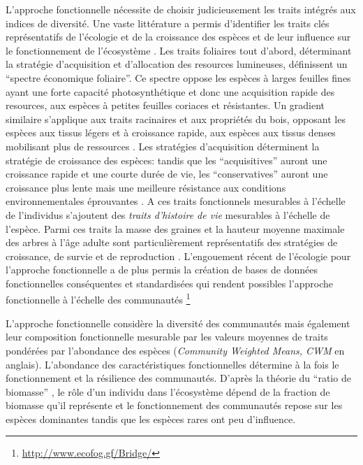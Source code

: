 \documentclass[
  11pt,
  french,
  A4paper,
  extrafontsizes,onecolumn,openright
  ]{memoir}
\begin{document}
L'approche fonctionnelle nécessite de choisir judicieusement les traits
intégrés aux indices de diversité. Une vaste littérature a permis
d'identifier les traits clés représentatifs de l'écologie et de la
croissance des espèces et de leur influence sur le fonctionnement de
l'écosystème \autocite{Reich2014}. Les traits foliaires tout d'abord,
déterminant la stratégie d'acquisition et d'allocation des resources
lumineuses, définissent un ``spectre économique foliaire''. Ce spectre
oppose les espèces à larges feuilles fines ayant une forte capacité
photosynthétique et donc une acquisition rapide des resources, aux
espèces à petites feuilles coriaces et résistantes. Un gradient
similaire s'applique aux traits racinaires et aux propriétés du bois,
opposant les espèces aux tissus légers et à croissance rapide, aux
espèces aux tissus denses mobilisant plus de ressources
\autocites{Chave2009}{Valverde-Barrantes2017}. Les stratégies
d'acquisition déterminent la stratégie de croissance des espèces: tandis
que les ``acquisitives'' auront une croissance rapide et une courte
durée de vie, les ``conservatives'' auront une croissance plus lente
mais une meilleure résistance aux conditions environnementales
éprouvantes \autocites{Reich1997}{Wright2004}. A ces traits fonctionnels
mesurables à l'échelle de l'individus s'ajoutent des \emph{traits
d'histoire de vie} mesurables à l'échelle de l'espèce. Parmi ces traits
la masse des graines et la hauteur moyenne maximale des arbres à l'âge
adulte sont particulièrement représentatifs des stratégies de
croissance, de survie et de reproduction
\autocites{Westoby1998}{Herault2011}. L'engouement récent de l'écologie
pour l'approche fonctionnelle a de plus permis la création de bases de
données fonctionnelles conséquentes et standardisées qui rendent
possibles l'approche fonctionnelle à l'échelle des communautés
\autocites{Kattge2011}{Perez-Harguindeguy2013} \footnote{\url{http://www.ecofog.gf/Bridge/}}

L'approche fonctionnelle considère la diversité des communautés mais
également leur composition fonctionnelle mesurable par les valeurs
moyennes de traits pondérées par l'abondance des espèces
(\emph{Community Weighted Means, CWM} en anglais). L'abondance des
caractéristiques fonctionnelles détermine à la fois le fonctionnement et
la résilience des communautés. D'après la théorie du ``ratio de
biomasse'' \autocite{Grime1998}, le rôle d'un individu dans l'écosystème
dépend de la fraction de biomasse qu'il représente et le fonctionnement
des communautés repose sur les espèces dominantes tandis que les espèces
rares ont peu d'influence.
\end{document}
